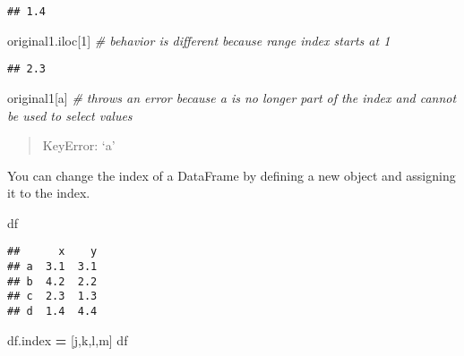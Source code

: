 \documentclass[
]{book}
\newenvironment{Shaded}{\begin{snugshade}}{\end{snugshade}}
\newcommand{\CommentTok}[1]{\textcolor[rgb]{0.56,0.35,0.01}{\textit{#1}}}
\newcommand{\DecValTok}[1]{\textcolor[rgb]{0.00,0.00,0.81}{#1}}
\newcommand{\NormalTok}[1]{#1}
\newcommand{\OperatorTok}[1]{\textcolor[rgb]{0.81,0.36,0.00}{\textbf{#1}}}
\newcommand{\StringTok}[1]{\textcolor[rgb]{0.31,0.60,0.02}{#1}}
\begin{document}
\begin{verbatim}
## 1.4
\end{verbatim}

\begin{Shaded}
\begin{Highlighting}[]
\NormalTok{original1.iloc[}\DecValTok{1}\NormalTok{] }\CommentTok{\# behavior is different because range index starts at 1}
\end{Highlighting}
\end{Shaded}

\begin{verbatim}
## 2.3
\end{verbatim}

\begin{Shaded}
\begin{Highlighting}[]
\NormalTok{original1[}\StringTok{\textquotesingle{}a\textquotesingle{}}\NormalTok{] }\CommentTok{\# throws an error because \textquotesingle{}a\textquotesingle{} is no longer part of the index and cannot be used to select values}
\end{Highlighting}
\end{Shaded}

\begin{quote}
KeyError: `a'
\end{quote}

You can change the index of a DataFrame by defining a new object and assigning it to the index.

\begin{Shaded}
\begin{Highlighting}[]
\NormalTok{df}
\end{Highlighting}
\end{Shaded}

\begin{verbatim}
##      x    y
## a  3.1  3.1
## b  4.2  2.2
## c  2.3  1.3
## d  1.4  4.4
\end{verbatim}

\begin{Shaded}
\begin{Highlighting}[]
\NormalTok{df.index }\OperatorTok{=}\NormalTok{ [}\StringTok{\textquotesingle{}j\textquotesingle{}}\NormalTok{,}\StringTok{\textquotesingle{}k\textquotesingle{}}\NormalTok{,}\StringTok{\textquotesingle{}l\textquotesingle{}}\NormalTok{,}\StringTok{\textquotesingle{}m\textquotesingle{}}\NormalTok{]}
\NormalTok{df}
\end{Highlighting}
\end{Shaded}
\end{document}
